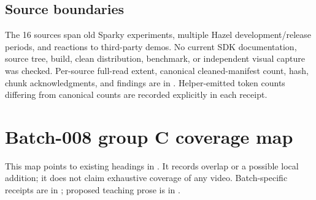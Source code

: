 \subsection{Source boundaries}\label{appendix-877738f6f4d2-source-boundaries}

\hypertarget{appendix-877738f6f4d2-source-boundaries}{}

The 16 sources span old Sparky experiments, multiple Hazel development/release periods, and reactions to third-party demos. No current SDK documentation, source tree, build, clean distribution, benchmark, or independent visual capture was checked. Per-source full-read extent, canonical cleaned-manifest count, hash, chunk acknowledgments, and findings are in . Helper-emitted token counts differing from canonical counts are recorded explicitly in each receipt.

\section{Batch-008 group C coverage map}\label{appendix-877738f6f4d2-batch-008-group-c-coverage-map}

\hypertarget{appendix-877738f6f4d2-batch-008-group-c-coverage-map}{}

This map points to existing headings in . It records overlap or a possible local addition; it does not claim exhaustive coverage of any video. Batch-specific receipts are in ; proposed teaching prose is in .

